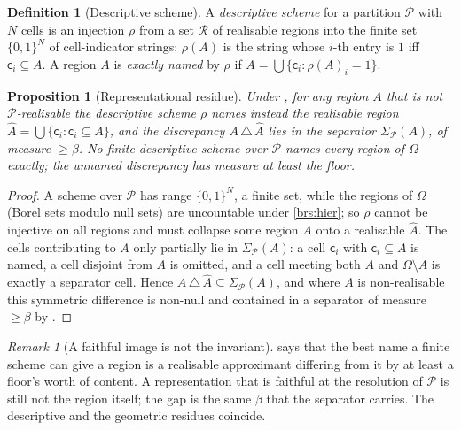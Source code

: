\documentclass[11pt,a4paper]{article}
\theoremstyle{thmstyle}
\newtheorem{proposition}[theorem]{Proposition}
\theoremstyle{definition}
\newtheorem{definition}[theorem]{Definition}
\theoremstyle{remark}
\newtheorem{remark}[theorem]{Remark}
\newcommand{\Space}{\Omega}
\newcommand{\thick}{\beta}
\newcommand{\Part}{\mathscr{P}}
\newcommand{\cell}{\mathsf{c}}
\begin{document}
\begin{definition}[Descriptive scheme]
\label{def:scheme}
A \emph{descriptive scheme} for a partition $\Part$ with $N$ cells is an
injection $\rho$ from a set $\mathcal{R}$ of realisable regions into the finite
set $\{0,1\}^{N}$ of cell-indicator strings: $\rho(A)$ is the string whose
$i$-th entry is $1$ iff $\cell_i\subseteq A$. A region $A$ is
\emph{exactly named} by $\rho$ if $A=\bigcup\{\cell_i:\rho(A)_i=1\}$.
\end{definition}

\begin{proposition}[Representational residue]
\label{prop:rep-residue}
Under , for any region $A$ that is not $\Part$-realisable the
descriptive scheme $\rho$ names instead the realisable region
$\widehat A=\bigcup\{\cell_i:\cell_i\subseteq A\}$, and the discrepancy
$A\,\triangle\,\widehat A$ lies in the separator $\Sigma_\Part(A)$, of measure
$\ge\thick$. No finite descriptive scheme over $\Part$ names every region of
$\Space$ exactly; the unnamed discrepancy has measure at least the floor.
\end{proposition}

\begin{proof}
A scheme over $\Part$ has range $\{0,1\}^N$, a finite set, while the regions of
$\Space$ (Borel sets modulo null sets) are uncountable under \ref{brs:hier}; so
$\rho$ cannot be injective on all regions and must collapse some region $A$ onto
a realisable $\widehat A$. The cells contributing to $A$ only partially lie in
$\Sigma_\Part(A)$: a cell $\cell_i$ with $\cell_i\subseteq A$ is named, a cell
disjoint from $A$ is omitted, and a cell meeting both $A$ and $\Space\setminus A$
is exactly a separator cell. Hence $A\,\triangle\,\widehat A\subseteq
\Sigma_\Part(A)$, and where $A$ is non-realisable this symmetric difference is
non-null and contained in a separator of measure $\ge\thick$ by
.
\end{proof}

\begin{remark}[A faithful image is not the invariant]
\label{rem:faithful}
 says that the best name a finite scheme can give a region
is a realisable approximant differing from it by at least a floor's worth of
content. A representation that is faithful at the resolution of $\Part$ is still
not the region itself; the gap is the same $\thick$ that the separator carries.
The descriptive and the geometric residues coincide.
\end{remark}
\end{document}
